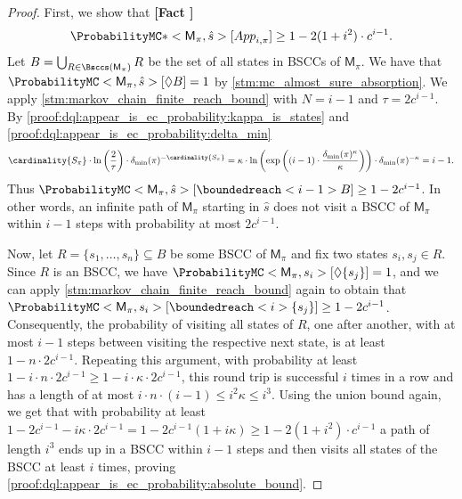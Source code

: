 \documentclass{theoretics}
\newcommand{\UnionSym}{\bigcup}
\newcommand{\Union}{\UnionSym}
\newcommand{\MC}{\mathsf{M}}
\newcommand{\States}{S}
\newcommand{\initialstate}{\hat{s}}
\newcommand{\strategy}{\pi}
\newcommand{\reach}{\Diamond}
\newcounter{proofref}
\newcommand{\plabel}[1]{\refstepcounter{proofref}\label{#1}\textbf{[Fact \Roman{proofref}]}}
\begin{document}
\begin{proof}
	First, we show that \plabel{proof:dql:appear_is_ec_probability:absolute_bound}
	\begin{equation*}
		\ProbabilityMC*<\MC_\strategy, \initialstate>[{App}_{i, \strategy}] \geq 1 - 2 (1 + i^2) \cdot c^{i - 1}.
	\end{equation*}
	Let $B = \Union_{R \in \Bsccs(\MC_\strategy)} R$ be the set of all states in BSCCs of $\MC_\strategy$.
	We have that $\ProbabilityMC<\MC_\strategy, \initialstate>[\reach B] = 1$ by \cref{stm:mc_almost_sure_absorption}.
	We apply \cref{stm:markov_chain_finite_reach_bound} with $N = i - 1$ and $\tau = 2 c^{i - 1}$.
	By \ref{proof:dql:appear_is_ec_probability:kappa_is_states} and \ref{proof:dql:appear_is_ec_probability:delta_min}
	\begin{equation*}
		\cardinality{\States_\strategy} \cdot \ln\left(\frac{2}{\tau} \right) \cdot \delta_{\min}(\strategy)^{-\cardinality{\States_\strategy}} = \kappa \cdot \ln\left(\exp\left( (i-1) \cdot \frac{\delta_{\min}(\strategy)^\kappa}{\kappa}\right)\right) \cdot \delta_{\min}(\strategy)^{-\kappa} = i - 1.
	\end{equation*}
	Thus $\ProbabilityMC<\MC_\strategy, \initialstate>[\boundedreach<i - 1> B] \geq 1 - 2 c^{i - 1}$.
	In other words, an infinite path of $\MC_\strategy$ starting in $\initialstate$ does not visit a BSCC of $\MC_\strategy$ within $i - 1$ steps with probability at most $2 c^{i - 1}$.

	Now, let $R = \{s_1, \dots, s_n\} \subseteq B$ be some BSCC of $\MC_\strategy$ and fix two states $s_i, s_j \in R$.
	Since $R$ is an BSCC, we have $\ProbabilityMC<\MC_\strategy, s_i>[\reach \{s_j\}] = 1$, and we can apply \cref{stm:markov_chain_finite_reach_bound} again to obtain that $\ProbabilityMC<\MC_\strategy, s_i>[\boundedreach<i> \{s_j\}] \geq 1 - 2 c^{i - 1}$.
	Consequently, the probability of visiting all states of $R$, one after another, with at most $i - 1$ steps between visiting the respective next state, is at least $1 - n \cdot 2 c^{i - 1}$.
	Repeating this argument, with probability at least $1 - i \cdot n \cdot 2 c^{i - 1} \geq 1 - i \cdot \kappa \cdot 2 c^{i - 1}$, this round trip is successful $i$ times in a row and has a length of at most $i \cdot n \cdot (i - 1) \leq i^2 \kappa \leq i^3$.
	Using the union bound again, we get that with probability at least $1 - 2 c^{i - 1} - i \kappa \cdot 2 c^{i - 1} = 1 - 2 c^{i - 1} (1 + i \kappa) \geq 1 - 2 (1 + i^2) \cdot c^{i - 1}$ a path of length $i^3$ ends up in a BSCC within $i - 1$ steps and then visits all states of the BSCC at least $i$ times, proving \ref{proof:dql:appear_is_ec_probability:absolute_bound}.


\end{proof}
\end{document}
